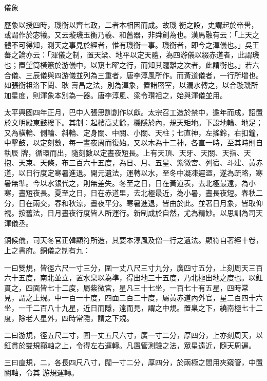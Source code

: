 \begin{pinyinscope}
 儀象



 歷象以授四時，璣衡以齊七政，二者本相因而成。故璣
 衡之設，史謂起於帝嚳，或謂作於宓犧。又云璇璣玉衡乃羲、和舊器，非舜創為也。漢馬融有云：「上天之體不可得知，測天之事見於經者，惟有璣衡一事。璣衡者，即今之渾儀也。」吳王蕃之論亦云：「渾儀之制，置天梁、地平以定天體，為四游儀以綴赤道者，此謂璣也；置望筒橫簫於游儀中，以窺七曜之行，而知其躔離之次者，此謂衡也。」若六合儀、三辰儀與四游儀並列為三重者，唐李淳風所作。而黃道儀者，一行所增也。如張衡祖洛下閎、耿
 壽昌之法，別為渾象，置諸密室，以漏水轉之，以合璇璣所加星度，則渾象本別為一器。唐李淳風、梁令瓚祖之，始與渾儀並用。



 太平興國四年正月，巴中人張思訓創作以獻。太宗召工造於禁中，逾年而成，詔置於文明殿東鼓樓下。其制：起樓高丈餘，機隱於內，規天矩地。下設地輪、地足；又為橫輪、側輪、斜輪、定身關、中關、小關、天柱；七直神，左搖鈴，右扣鐘，中擊鼓，以定刻數，每一晝夜周而復始。又以木為十二神，各直一時，至其時則自執辰
 牌，循環而出，隨刻數以定晝夜短長。上有天頂、天牙、天關、天指、天抱、天束、天條，布三百六十五度，為日、月、五星、紫微宮、列宿、斗建、黃赤道，以日行度定寒暑進退。開元遺法，運轉以水，至冬中凝凍遲澀，遂為疏略，寒暑無準。今以水銀代之，則無差失。冬至之日，日在黃道表，去北極最遠，為小寒，晝短夜長。夏至之日，日在赤道里，去北極最近，為小暑，晝長夜短。春秋二分，日在兩交，春和秋涼，晝夜平分。寒暑進退，皆由於此。並著日月象，皆取仰
 視。按舊法，日月晝夜行度皆人所運行。新制成於自然，尤為精妙。以思訓為司天渾儀丞。



 銅候儀，司天冬官正韓顯符所造，其要本淳風及僧一行之遺法。顯符自著經十卷，上之書府。銅儀之制有九：



 一曰雙規，皆徑六尺一寸三分，圍一丈八尺三寸九分，廣四寸五分，上刻周天三百六十五度，南北並立，置水臬以為準，得出地三十五度，乃北極出地之度也。以釭貫之，四面皆七十二度，屬紫微宮，星凡三十七坐，一百七十有五星，四時常
 見，謂之上規。中一百一十度，四面二百二十度，屬黃赤道內外官，星二百四十六坐，一千二百八十九星，近日而隱，遠而見，謂之中規。置臬之下，繞南極七十二度，除老人星外，四時常隱，謂之下規。



 二曰游規，徑五尺二寸，圍一丈五尺六寸，廣一寸二分，厚四分，上亦刻周天，以釭貫於雙規巔軸之上，令得左右運轉。凡置管測驗之法，眾星遠近，隨天周遍。



 三曰直規，二，各長四尺八寸，闊一寸二分，厚四分，於兩極之間用夾窺管，中置關軸，令其
 游規運轉。




\end{pinyinscope}
